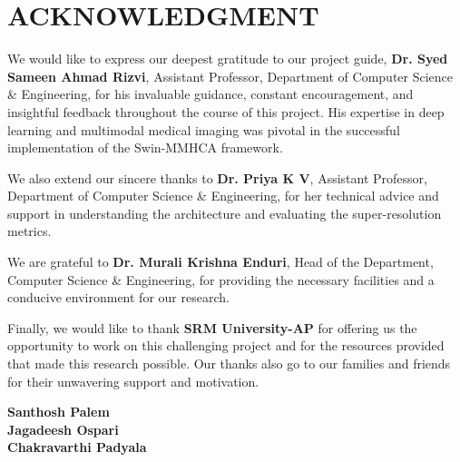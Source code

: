 \chapter*{ACKNOWLEDGMENT}

We would like to express our deepest gratitude to our project guide, \textbf{Dr. Syed Sameen Ahmad Rizvi}, Assistant Professor, Department of Computer Science \& Engineering, for his invaluable guidance, constant encouragement, and insightful feedback throughout the course of this project. His expertise in deep learning and multimodal medical imaging was pivotal in the successful implementation of the Swin-MMHCA framework.

We also extend our sincere thanks to \textbf{Dr. Priya K V}, Assistant Professor, Department of Computer Science \& Engineering, for her technical advice and support in understanding the architecture and evaluating the super-resolution metrics.

We are grateful to \textbf{Dr. Murali Krishna Enduri}, Head of the Department, Computer Science \& Engineering, for providing the necessary facilities and a conducive environment for our research.

Finally, we would like to thank \textbf{SRM University-AP} for offering us the opportunity to work on this challenging project and for the resources provided that made this research possible. Our thanks also go to our families and friends for their unwavering support and motivation.

\vspace{1.5cm}
\begin{flushright}
\textbf{Santhosh Palem}\\
\textbf{Jagadeesh Ospari}\\
\textbf{Chakravarthi Padyala}
\end{flushright}
